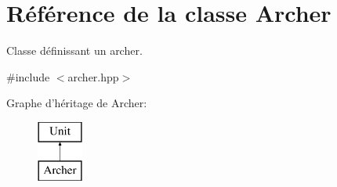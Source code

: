 \hypertarget{classArcher}{\section{Référence de la classe Archer}
\label{classArcher}
}


Classe définissant un archer.  




{\ttfamily \#include $<$archer.\+hpp$>$}

Graphe d'héritage de Archer\+:\begin{figure}[H]
\begin{center}
\leavevmode
\includegraphics[height=2.000000cm]{classArcher}
\end{center}
\end{figure}
